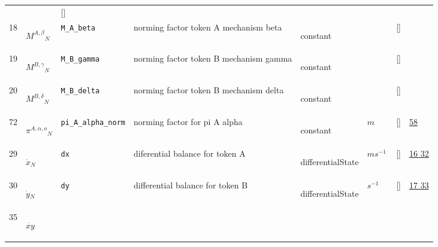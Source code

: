 \begin{longtable}{|p{1cm}|p{3cm}|p{3cm}|p{7cm}|p{3.0cm}|p{3cm}|p{2cm}|p{1cm}|}
             & $  $
             & []
             & \\
    18
             & \hypertarget{"v:18"}{ $ {{M^{A,\beta}}}{_{N}} $}
             & \verb|M_A_beta|
             & norming factor token A mechanism beta
             & \begin{lay}constant \end{lay}
             & $  $
             & []
             & \\
    19
             & \hypertarget{"v:19"}{ $ {{M^{B,\gamma}}}{_{N}} $}
             & \verb|M_B_gamma|
             & norming factor token B mechanism gamma
             & \begin{lay}constant \end{lay}
             & $  $
             & []
             & \\
    20
             & \hypertarget{"v:20"}{ $ {{M^{B,\delta}}}{_{N}} $}
             & \verb|M_B_delta|
             & norming factor token B mechanism delta
             & \begin{lay}constant \end{lay}
             & $  $
             & []
             & \\
    72
             & \hypertarget{"v:72"}{ $ {{\pi^{A,\alpha,o}}}{_{N}} $}
             & \verb|pi_A_alpha_norm|
             & norming factor for pi A alpha
             & \begin{lay}constant \end{lay}
             & $ m  $
             & []
             & \hyperlink{"e:58"}{ 58 }
                 \\
    29
             & \hypertarget{"v:29"}{ $ {{\dot{x}}}{_{N}} $}
             & \verb|dx|
             & diferential balance for token A
             & \begin{lay}differentialState \end{lay}
             & $ m s^{-1} \, $
             & []
             & \hyperlink{"e:16"}{ 16 }
                 \hyperlink{"e:32"}{ 32 }
                 \\
    30
             & \hypertarget{"v:30"}{ $ {{\dot{y}}}{_{N}} $}
             & \verb|dy|
             & differential balance for token B
             & \begin{lay}differentialState \end{lay}
             & $ s^{-1} \, $
             & []
             & \hyperlink{"e:17"}{ 17 }
                 \hyperlink{"e:33"}{ 33 }
                 \\
    35
             & \hypertarget{"v:35"}{ $ {{\dot{xy}}}{_{}} $}

\end{longtable}
